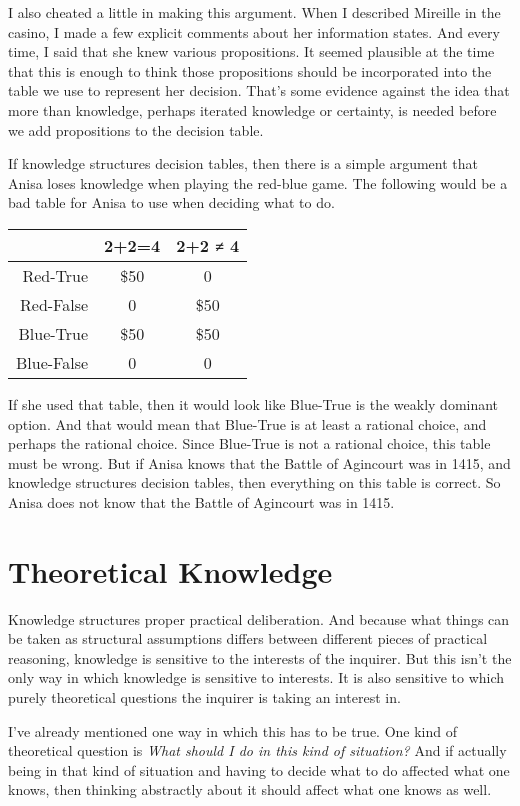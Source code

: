\documentclass[
  11pt,
]{book}
\begin{document}
I also cheated a little in making this argument. When I described Mireille in the casino, I made a few explicit comments about her information states. And every time, I said that she knew various propositions. It seemed plausible at the time that this is enough to think those propositions should be incorporated into the table we use to represent her decision. That's some evidence against the idea that more than knowledge, perhaps iterated knowledge or certainty, is needed before we add propositions to the decision table.

If knowledge structures decision tables, then there is a simple argument that Anisa loses knowledge when playing the red-blue game. The following would be a bad table for Anisa to use when deciding what to do.

\begin{longtable}[]{@{}rcc@{}}
\toprule()
~ & 2+2=4 & 2+2 ≠ 4 \\
\midrule()
\endhead
Red-True & \$50 & 0 \\
Red-False & 0 & \$50 \\
Blue-True & \$50 & \$50 \\
Blue-False & 0 & 0 \\
\bottomrule()
\end{longtable}

If she used that table, then it would look like Blue-True is the weakly dominant option. And that would mean that Blue-True is at least a rational choice, and perhaps the rational choice. Since Blue-True is not a rational choice, this table must be wrong. But if Anisa knows that the Battle of Agincourt was in 1415, and knowledge structures decision tables, then everything on this table is correct. So Anisa does not know that the Battle of Agincourt was in 1415.

\hypertarget{theoreticalknowledge}{%
\section{Theoretical Knowledge}\label{theoreticalknowledge}}

Knowledge structures proper practical deliberation. And because what things can be taken as structural assumptions differs between different pieces of practical reasoning, knowledge is sensitive to the interests of the inquirer. But this isn't the only way in which knowledge is sensitive to interests. It is also sensitive to which purely theoretical questions the inquirer is taking an interest in.

I've already mentioned one way in which this has to be true. One kind of theoretical question is \emph{What should I do in this kind of situation?} And if actually being in that kind of situation and having to decide what to do affected what one knows, then thinking abstractly about it should affect what one knows as well.
\end{document}
